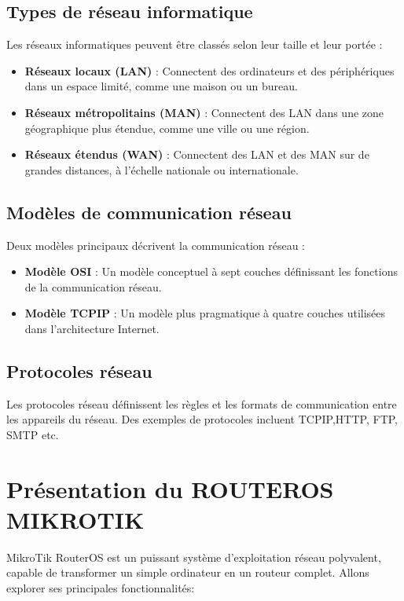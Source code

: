 \subsection{Types de réseau informatique}
Les réseaux informatiques peuvent être classés selon leur taille et leur portée :  
\begin{itemize}
    \item \textbf{Réseaux locaux (LAN)} : Connectent des ordinateurs et des périphériques dans un espace limité, comme une maison ou un bureau.
    \item \textbf{Réseaux métropolitains (MAN)} : Connectent des LAN dans une zone géographique plus étendue, comme une ville ou une région.
    \item \textbf{Réseaux étendus (WAN)} : Connectent des LAN et des MAN sur de grandes distances, à l'échelle nationale ou internationale.
\end{itemize}

\subsection{Modèles de communication réseau}
Deux modèles principaux décrivent la communication réseau :  
\begin{itemize}
    \item \textbf{Modèle \gls{OSI}} : Un modèle conceptuel à sept couches définissant les fonctions de la communication réseau.
    \item \textbf{Modèle  \gls{TCP}\/\gls{IP}} : Un modèle plus pragmatique à quatre couches utilisées dans l'architecture Internet.
\end{itemize}

\subsection{Protocoles réseau}
Les protocoles réseau définissent les règles et les formats de communication entre les appareils du réseau. Des exemples de protocoles incluent \gls{TCP}\/\gls{IP},\gls{HTTP}, \gls{FTP}, \gls{SMTP} etc.



\section{Présentation du ROUTEROS MIKROTIK \cite{mikrotik-docs}}
MikroTik \gls{RouterOS} est un puissant système d'exploitation réseau polyvalent, 
capable de transformer un simple ordinateur en un routeur complet. Allons explorer 
ses principales fonctionnalités:

